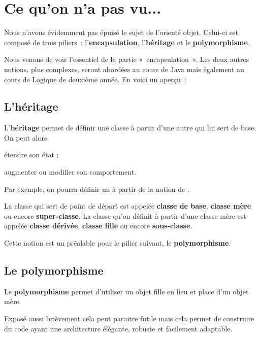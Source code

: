 \section{Ce qu'on n'a pas vu...}

	Nous n'avons évidemment pas épuisé le sujet de
	l'orienté objet. 
	Celui-ci est composé de trois piliers~: l'\textbf{encapsulation},
	l'\textbf{héritage} et le \textbf{polymorphisme}.
	
	Nous venons de voir l'essentiel de la partie «~encapsulation~». 
	Les deux autres notions, plus complexes, 
	seront abordées au cours de Java 
	mais également au cours de Logique de deuxième année. 
	En voici un aperçu~:
	
	\subsection{L'héritage}
	
		L’\textbf{héritage} permet de définir une classe 
		à partir d’une autre qui lui sert de base. 
		On peut alors
		\begin{liste}
			\item étendre son état ;
			\item augmenter ou modifier son comportement.
		\end{liste}
		
		Par exemple, on pourra définir un  à partir
		de la notion de .
		
		La classe qui sert de point de départ est appelée \textbf{classe de
		base}, \textbf{classe mère} ou encore \textbf{super-classe}. La classe
		qu’on définit à partir d’une classe mère est appelée \textbf{classe
		dérivée}, \textbf{classe fille} ou encore \textbf{sous-classe}.
		
		Cette notion est un préalable pour le pilier suivant, le
		\textbf{polymorphisme}.
	
	\subsection{Le polymorphisme}
	
		Le \textbf{polymorphisme} permet d’utiliser un objet fille 
		en lieu et place d’un objet mère. 
		
		Exposé aussi brièvement cela peut paraitre futile mais cela
		permet de construire du code ayant une architecture élégante, robuste
		et facilement adaptable.

